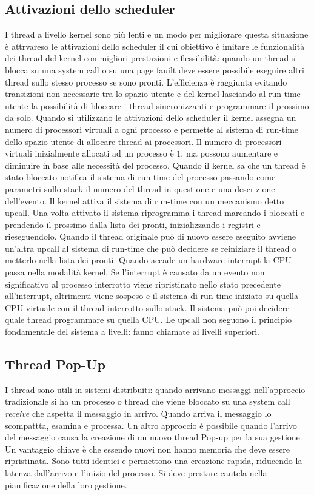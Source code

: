 \subsection{Attivazioni dello scheduler}
I thread a livello kernel sono pi\`u lenti e un modo per migliorare questa situazione \`e attrvareso le attivazioni dello scheduler il cui obiettivo \`e imitare le funzionalit\`a dei
thread del kernel con migliori prestazioni e flessibilit\`a: quando un thread si blocca su una system call o su una page fauilt deve essere possibile eseguire altri thread sullo stesso
processo se sono pronti. L'efficienza \`e raggiunta evitando transizioni non necessarie tra lo spazio utente e del kernel lasciando al run-time utente la possibilit\`a di bloccare i
thread sincronizzanti e programmare il prossimo da solo. Quando si utilizzano le attivazioni dello scheduler il kernel assegna un numero di processori virtuali a ogni processo e permette
al sistema di run-time dello spazio utente di allocare thread ai processori. Il numero di processori virtuali inizialmente allocati ad un processo \`e $1$, ma possono aumentare e
diminuire in base alle necessit\`a del processo. Quando il kernel sa che un thread \`e stato bloccato notifica il sistema di run-time del processo passando come parametri sullo stack
il numero del thread in questione e una descrizione dell'evento. Il kernel attiva il sistema di run-time con un meccanismo detto upcall. Una volta attivato il sistema riprogramma i
thread marcando i bloccati e prendendo il prossimo dalla lista dei pronti, inizializzando i registri e rieseguendolo. Quando il thread originale pu\`o di nuovo essere eseguito avviene
un'altra upcall al sistema di run-time che pu\`o decidere se reiniziare il thread o metterlo nella lista dei pronti. Quando accade un hardware interrupt la CPU passa nella modalit\`a
kernel. Se l'interrupt \`e causato da un evento non significativo al processo interrotto viene ripristinato nello stato precedente all'interrupt, altrimenti viene sospeso e il sistema di
run-time iniziato su quella CPU virtuale con il thread interrotto sullo stack. Il sistema pu\`o poi decidere quale thread programmare su quella CPU. Le upcall non seguono il principio
fondamentale del sistema a livelli: fanno chiamate ai livelli superiori.
\subsection{Thread Pop-Up}
I thread sono utili in sistemi distribuiti: quando arrivano messaggi nell'approccio tradizionale si ha un processo o thread che viene bloccato su una system call \emph{receive} che
aspetta il messaggio in arrivo. Quando arriva il messaggio lo scompattta, esamina e processa. Un altro approccio \`e possibile quando l'arrivo del messaggio causa la creazione di un
nuovo thread Pop-up per la sua gestione. Un vantaggio chiave \`e che essendo nuovi non hanno memoria che deve essere ripristinata. Sono tutti identici e permettono una creazione rapida,
riducendo la latenza dall'arrivo e l'inizio del processo. Si deve prestare cautela nella pianificazione della loro gestione.
